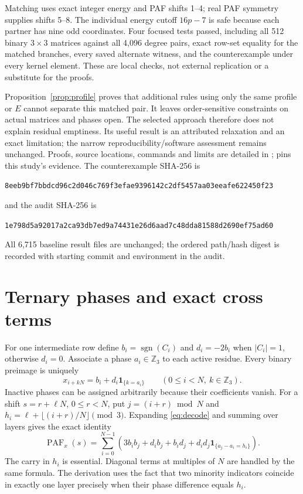 \documentclass[11pt]{article}
\newcommand{\PAF}{\operatorname{PAF}}
\newcommand{\Z}{\mathbb Z}
\newcommand{\ind}[1]{\mathbf 1_{\{#1\}}}
\begin{document}
Matching uses exact integer energy and PAF shifts 1--4; real PAF symmetry
supplies shifts 5--8. The individual energy cutoff $16p-7$ is safe because
each partner has nine odd coordinates. Four focused tests passed, including
all 512 binary $3\times3$ matrices against all 4,096 degree pairs, exact
row-set equality for the matched branches, every saved alternate witness,
and the counterexample under every kernel element. These are local checks,
not external replication or a substitute for the proofs.

Proposition~\ref{prop:profile} proves that additional rules using only the
same profile or $E$ cannot separate this matched pair. It leaves
order-sensitive constraints on actual matrices and phases open.
The selected approach therefore does not explain residual emptiness.
Its useful result is an attributed relaxation and an exact limitation;
the narrow reproducibility/software assessment remains unchanged.
Proofs, source locations, commands and limits are detailed in
;
 pins this study's evidence.
The counterexample SHA-256 is
\begin{center}\footnotesize\texttt{8eeb9bf7bbdcd96c2d046c769f3efae9396142c2df5457aa03eeafe622450f23}\end{center}
and the audit SHA-256 is
\begin{center}\footnotesize\texttt{1e798d5a92017a2ca93db7ed9a74431e26d6aad7c48dda81588d2690ef75ad60}\end{center}
All 6,715 baseline result files are unchanged; the ordered path/hash digest
is recorded with starting commit and environment in the audit.

\section{Ternary phases and exact cross terms}
For one intermediate row define $b_i=\operatorname{sgn}(C_i)$ and
$d_i=-2b_i$ when $|C_i|=1$, otherwise $d_i=0$. Associate a phase
$a_i\in\Z_3$ to each active residue. Every binary preimage is uniquely
\begin{equation}\label{eq:decode}
 x_{i+kN}=b_i+d_i\ind{k=a_i}\qquad(0\le i<N,\ k\in\Z_3).
\end{equation}
Inactive phases can be assigned arbitrarily because their coefficients vanish.
For a shift $s=r+\ell N$, $0\le r<N$, put
$j=(i+r)\bmod N$ and $h_i=\ell+\lfloor(i+r)/N\rfloor\pmod3$.
Expanding \eqref{eq:decode} and summing over layers gives the exact identity
\begin{equation}\label{eq:phase}
 \PAF_x(s)=\sum_{i=0}^{N-1}
 \left(3b_i b_j+d_i b_j+b_i d_j+
 d_i d_j\ind{a_j-a_i=h_i}\right).
\end{equation}
The carry in $h_i$ is essential. Diagonal terms at multiples of $N$ are
handled by the same formula. The derivation uses the fact that two minority
indicators coincide in exactly one layer precisely when their phase
difference equals $h_i$.
\end{document}
